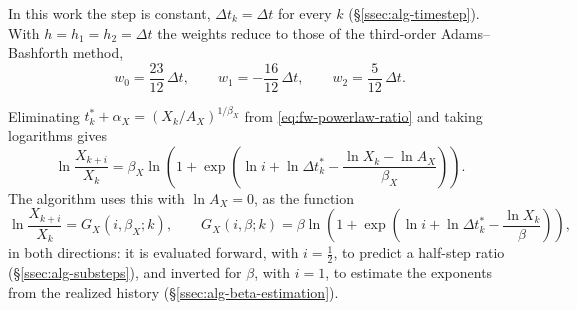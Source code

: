 \documentclass{article}
\begin{document}
In this work the step is constant, $\Delta t_k = \Delta t$ for every $k$
(\S\ref{ssec:alg-timestep}). With $h = h_1 = h_2 = \Delta t$ the weights
reduce to those of the third-order Adams--Bashforth method,
\begin{equation}\label{eq:fw-dtstar-weights-const}
  w_0 = \frac{23}{12}\, \Delta t, \qquad
  w_1 = -\frac{16}{12}\, \Delta t, \qquad
  w_2 = \frac{5}{12}\, \Delta t .
\end{equation}
\par
Eliminating $t_k^* + \alpha_X = (X_k/A_X)^{1/\beta_X}$ from
\eqref{eq:fw-powerlaw-ratio} and taking logarithms gives
\begin{equation}\label{eq:fw-log-ratio-A}
  \ln \frac{X_{k+i}}{X_k}
  = \beta_X \ln\!\left( 1 + \exp\!\left( \ln i + \ln \Delta t_k^* - \frac{\ln X_k - \ln A_X}{\beta_X} \right) \right).
\end{equation}
The algorithm uses this with $\ln A_X = 0$, as the function
\begin{equation}\label{eq:fw-log-ratio}
  \ln \frac{X_{k+i}}{X_k} = G_X(i, \beta_X; k),
  \qquad
  G_X(i, \beta; k) = \beta \ln\!\left( 1 + \exp\!\left( \ln i + \ln \Delta t_k^* - \frac{\ln X_k}{\beta} \right) \right),
\end{equation}
in both directions: it is evaluated forward, with $i = \tfrac12$, to predict
a half-step ratio (\S\ref{ssec:alg-substeps}), and inverted for $\beta$, with
$i = 1$, to estimate the exponents from the realized history
(\S\ref{ssec:alg-beta-estimation}).
\end{document}
